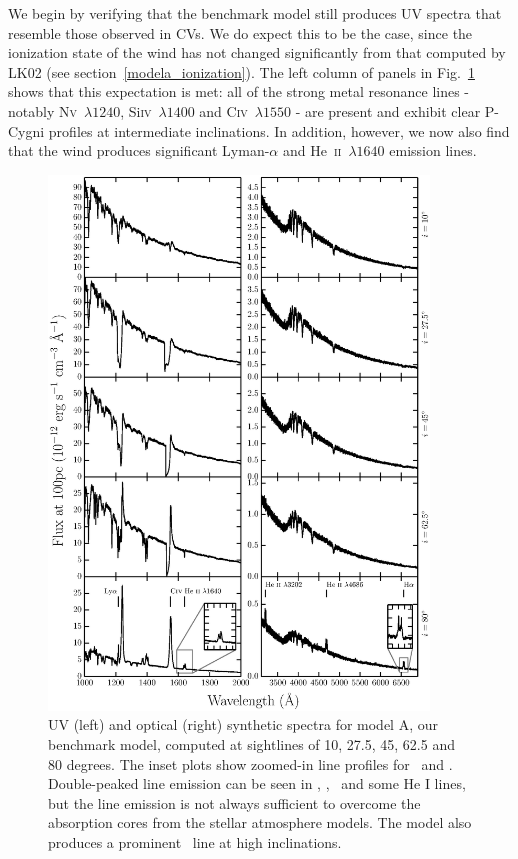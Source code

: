 \documentclass[preprint, a4paper, 11pt]{aastex}
\begin{document}
We begin by verifying that the benchmark model still produces UV
spectra that resemble those observed in CVs. We do expect this to be
the case, since the ionization state of the wind has not changed
significantly from that computed by LK02 (see section~\ref{modela_ionization}). 
The left column of panels in Fig.~\ref{spec} shows that this expectation
is met: all of the strong metal resonance
lines - notably N\textsc{v}~$\lambda1240$,
Si\textsc{iv}~$\lambda1400$ and C\textsc{iv}~$\lambda1550$ - 
are present and exhibit clear P-Cygni profiles
at intermediate inclinations. In addition, however, we now also find
that the wind produces significant Lyman-$\alpha$ and
He~\textsc{ii}~$\lambda1640$ emission lines. 

\begin{figure} %
\includegraphics[width=0.9\textwidth]{figures/modela_uv_opt.eps}
\caption{
UV (left) and optical (right) synthetic spectra for model A, our benchmark model,
computed at sightlines of 10, 27.5, 45, 62.5 and 80 degrees.	
The inset plots show zoomed-in line profiles for 
\heiiuv\ and \ha. Double-peaked line emission can be seen in 
\heiiuv, \heiiopt, \ha\ and some He I lines, but the 
line emission is not always sufficient to overcome the absorption
cores from the stellar atmosphere models. The model
also produces a prominent \heiioptnew\ line at high inclinations.
}
\label{spec}
\end{figure} %
\end{document}
